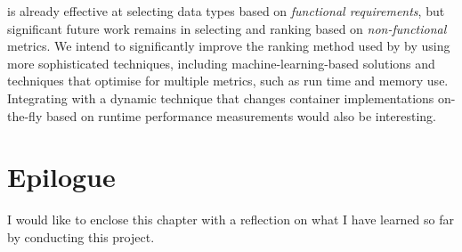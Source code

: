\Primrose{} is already effective at selecting data types based on \emph{functional requirements}, but significant future work remains in selecting and ranking based on \emph{non-functional} metrics. 
We intend to significantly improve the ranking method used by \Primrose{} by using 
more sophisticated techniques, including machine-learning-based solutions and techniques that optimise for multiple metrics, such as run time and memory use.
Integrating \Primrose{} with a dynamic technique that changes container implementations on-the-fly based on runtime performance measurements would also be interesting.

\section{Epilogue}
\label{chap2:epilogue}
I would like to enclose this chapter with a reflection on what I have learned so far by conducting this project.

